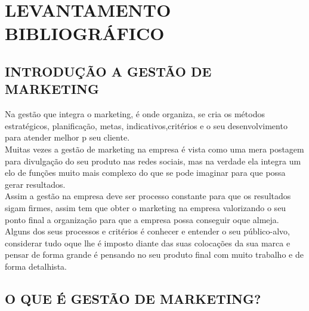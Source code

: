 \documentclass[a4paper,12pt]{article}
\begin{document}
   \section{LEVANTAMENTO BIBLIOGRÁFICO}
   \subsection{INTRODUÇÃO A GESTÃO DE MARKETING}
   Na gestão que integra o marketing, é onde organiza, se cria os métodos estratégicos, planificação, metas, indicativos,critérios e o seu desenvolvimento para atender melhor p seu cliente.\\
   Muitas vezes a gestão de marketing na empresa é vista como uma mera postagem para divulgação do seu produto nas redes sociais, mas na verdade ela integra um elo de funções muito mais complexo do que se pode imaginar para que possa gerar resultados.\\
   Assim a gestão na empresa deve ser processo constante para que os resultados sigam firmes, assim tem que obter o marketing na empresa valorizando o seu ponto final a organização para que a empresa possa conseguir oque almeja.\\
   Alguns dos seus processos e critérios é conhecer e entender o seu público-alvo, considerar tudo oque lhe é imposto diante das suas colocações da sua marca e pensar de forma grande é pensando no seu produto final com muito trabalho e de forma detalhista.

   \subsection{O QUE É GESTÃO DE MARKETING?}
\end{document}
